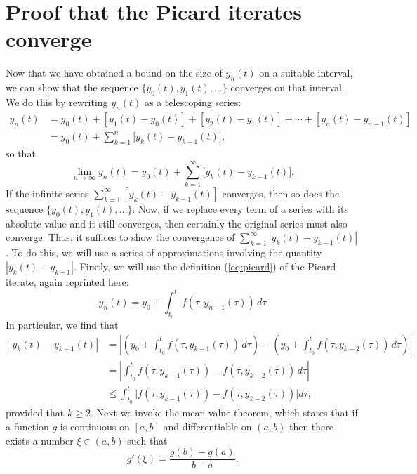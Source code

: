 \documentclass{myart}
\newcommand{\eq}[1]{(\ref{eq:#1})}
\begin{document}
\section{Proof that the Picard iterates converge}

Now that we have obtained a bound on the size of $y_n(t)$ on a suitable interval, we can show that the sequence $\{y_0(t), y_1(t), \ldots\}$ converges on that interval. We do this by rewriting $y_n(t)$ as a telescoping series:
\begin{align*}
y_n(t) &= y_0(t) + [y_1(t) - y_0(t)] + [y_2(t) - y_1(t)] + \cdots + [y_n(t) - y_{n-1}(t)] \\
&= y_0(t) + \sum_{k=1}^n \Big[y_k(t) - y_{k-1}(t)\Big],
\end{align*}
so that
\begin{equation*}
\lim_{n \to \infty} y_n(t) = y_0(t) + \sum_{k=1}^\infty \Big[y_k(t) - y_{k-1}(t)\Big].
\end{equation*}
If the infinite series $\sum_{k=1}^\infty [y_k(t) - y_{k-1}(t)]$ converges, then so does the sequence $\{y_0(t), y_1(t), \ldots\}$. Now, if we replace every term of a series with its absolute value and it still converges, then certainly the original series must also converge. Thus, it suffices to show the convergence of $\sum_{k=1}^\infty |y_k(t) - y_{k-1}(t)|$. To do this, we will use a series of approximations involving the quantity $|y_k(t) - y_{k-1}|$. Firstly, we will use the definition \eq{picard} of the Picard iterate, again reprinted here:
\begin{equation*}
y_n(t) = y_0 + \int_{t_0}^t f(\tau, y_{n-1}(\tau)) \,d\tau
\end{equation*}
In particular, we find that
\begin{align*}
|y_k(t) - y_{k-1}(t)| &= \left|\left(y_0 + \int_{t_0}^t f(\tau, y_{k-1}(\tau)) \,d\tau\right) - \left(y_0 + \int_{t_0}^t f(\tau, y_{k-2}(\tau)) \,d\tau\right)\right| \\
&= \left|\int_{t_0}^t f(\tau, y_{k-1}(\tau)) - f(\tau, y_{k-2}(\tau)) \,d\tau\right| \\
&\leq \int_{t_0}^t \Big|f(\tau, y_{k-1}(\tau)) - f(\tau, y_{k-2}(\tau))\Big| d\tau,
\end{align*}
provided that $k \geq 2$. Next we invoke the mean value theorem, which states that if a function $g$ is continuous on $[a, b]$ and differentiable on $(a, b)$ then there exists a number $\xi \in (a, b)$ such that
\begin{equation*}
g'(\xi) = \frac{g(b) - g(a)}{b - a}.
\end{equation*}
\end{document}
